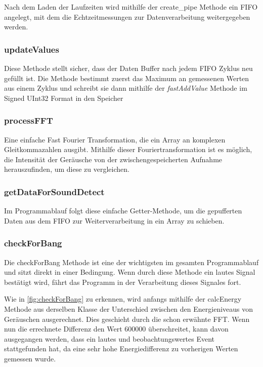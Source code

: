 Nach dem Laden der Laufzeiten wird mithilfe der create\_pipe Methode ein FIFO angelegt, mit dem die Echtzeitmessungen zur Datenverarbeitung weitergegeben werden.

\subsubsection{updateValues}

Diese Methode stellt sicher, dass der Daten Buffer nach jedem FIFO Zyklus neu gefüllt ist. Die Methode bestimmt zuerst das Maximum an gemessenen Werten aus einem Zyklus und schreibt sie dann mithilfe der \textit{fastAddValue} Methode im Signed UInt32 Format in den Speicher

\subsubsection{processFFT}

Eine einfache \glqq Fast Fourier Transformation\grqq, die ein Array an komplexen Gleitkommazahlen ausgibt. Mithilfe dieser Fouriertransformation ist es möglich, die Intensität der Geräusche von der zwischengespeicherten Aufnahme herauszufinden, um diese zu vergleichen.


\subsubsection{getDataForSoundDetect}

Im Programmablauf folgt diese einfache Getter-Methode, um die gepufferten Daten aus dem FIFO zur Weiterverarbeitung in ein Array zu schieben.

\subsubsection{checkForBang}

Die checkForBang Methode ist eine der wichtigsten im gesamten Programmablauf und sitzt direkt in einer Bedingung. Wenn durch diese Methode ein lautes Signal bestätigt wird, fährt das Programm in der Verarbeitung dieses Signales fort.

Wie in \autoref{fig:checkForBang} zu erkennen, wird anfangs mithilfe der calcEnergy Methode aus derselben Klasse der Unterschied zwischen den Energieniveaus von Geräuschen ausgerechnet. Dies geschieht durch die schon erwähnte FFT. Wenn nun die errechnete Differenz den Wert 600000 überschreitet, kann davon ausgegangen werden, dass ein lautes und beobachtungswertes Event stattgefunden hat, da eine sehr hohe Energiedifferenz zu vorherigen Werten gemessen wurde.


